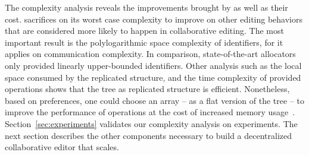 The complexity analysis reveals the improvements brought by \LSEQ as well as
their cost.  \LSEQ sacrifices on its worst case complexity to improve on other
editing behaviors that are considered more likely to happen in collaborative
editing. The most important result is the polylogarithmic space complexity of
identifiers, for it applies on communication complexity. In comparison,
state-of-the-art allocators~\cite{preguica2009commutative, weiss2009logoot} only
provided linearly upper-bounded identifiers. Other analysis such as the local
space consumed by the replicated structure, and the time complexity of provided
operations shows that the tree as replicated structure is
efficient. Nonetheless, based on preferences, one could choose an array -- as a
flat version of the tree -- to improve the performance of operations at the cost
of increased memory usage~\cite{weiss2009logoot}.  Section~\ref{sec:experiments}
validates our complexity analysis on experiments. The next section describes the
other components necessary to build a decentralized collaborative editor that
scales.



